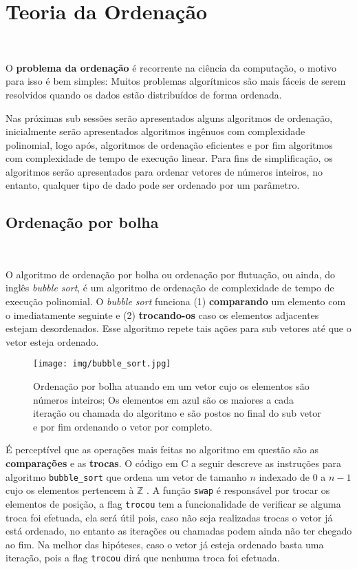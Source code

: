 \section{Teoria da Ordenação}
\

O \textbf{problema da ordenação} é recorrente na ciência da computação, o motivo para isso é bem simples: Muitos problemas algorítmicos são mais fáceis de serem resolvidos quando os dados estão distribuídos de forma ordenada.

Nas próximas sub sessões serão apresentados alguns algoritmos de ordenação, inicialmente serão apresentados algoritmos ingênuos com complexidade polinomial, logo após, algoritmos de ordenação eficientes e por fim algoritmos com complexidade de tempo de execução linear. Para fins de simplificação, os algoritmos serão apresentados para ordenar vetores de números inteiros, no entanto, qualquer tipo de dado pode ser ordenado por um parâmetro. 

\subsection{Ordenação por bolha}
\

O algoritmo de ordenação por bolha ou ordenação por flutuação, ou ainda, do inglês \textit{bubble sort}, é um algoritmo de ordenação de complexidade de tempo de execução polinomial. O \textit{bubble sort} funciona (1) \textbf{comparando} um elemento com o imediatamente seguinte e (2) \textbf{trocando-os} caso os elementos adjacentes estejam desordenados. Esse algoritmo repete tais ações para sub vetores até que o vetor esteja ordenado.

\begin{figure}[h]
  \centering
  \texttt{[image: img/bubble\_sort.jpg]}
  \caption{Ordenação por bolha atuando em um vetor cujo os elementos são números inteiros; Os elementos em azul são os maiores a cada iteração ou chamada do algoritmo e são postos no final do sub vetor e por fim ordenando o vetor por completo.}
  \label{bubble_sort}
\end{figure}

É perceptível que as operações mais feitas no algoritmo em questão são as \textbf{comparações} e as \textbf{trocas}. O código em C a seguir descreve as instruções para algoritmo \texttt{bubble\_sort} que ordena um vetor de tamanho $n$ indexado de $0$ a $n-1$ cujo os elementos pertencem à $\mathbb{Z}$ . A função \texttt{swap} é responsável por trocar os elementos de posição, a flag \texttt{trocou} tem a funcionalidade de verificar se alguma troca foi efetuada, ela será útil pois, caso não seja realizadas trocas o vetor já está ordenado, no entanto as iterações ou chamadas podem ainda não ter chegado ao fim. Na melhor das hipóteses, caso o vetor já esteja ordenado basta uma iteração, pois a flag \texttt{trocou} dirá que nenhuma troca foi efetuada.

